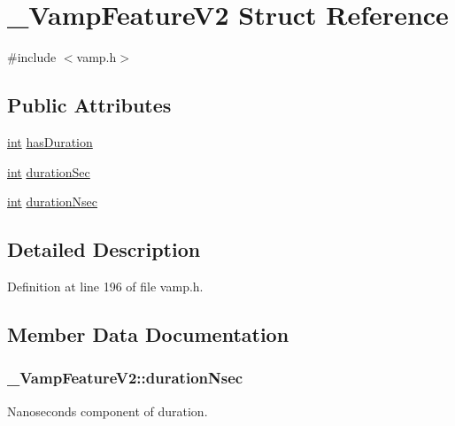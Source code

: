 \hypertarget{struct___vamp_feature_v2}{}\section{\+\_\+\+Vamp\+Feature\+V2 Struct Reference}
\label{struct___vamp_feature_v2}


{\ttfamily \#include $<$vamp.\+h$>$}

\subsection*{Public Attributes}
\begin{DoxyCompactItemize}
\item 
\hyperlink{xmltok_8h_a5a0d4a5641ce434f1d23533f2b2e6653}{int} \hyperlink{struct___vamp_feature_v2_a44d9c57f1ae197d3fec1a48c650cce81}{has\+Duration}
\item 
\hyperlink{xmltok_8h_a5a0d4a5641ce434f1d23533f2b2e6653}{int} \hyperlink{struct___vamp_feature_v2_abc95aac3a2efdef6ef0b17e7b6bd3daf}{duration\+Sec}
\item 
\hyperlink{xmltok_8h_a5a0d4a5641ce434f1d23533f2b2e6653}{int} \hyperlink{struct___vamp_feature_v2_af71693d907f69048d602d28edbce679e}{duration\+Nsec}
\end{DoxyCompactItemize}


\subsection{Detailed Description}


Definition at line 196 of file vamp.\+h.



\subsection{Member Data Documentation}
\subsubsection[{\texorpdfstring{duration\+Nsec}{durationNsec}}]{ \+\_\+\+Vamp\+Feature\+V2\+::duration\+Nsec}\hypertarget{struct___vamp_feature_v2_af71693d907f69048d602d28edbce679e}{}\label{struct___vamp_feature_v2_af71693d907f69048d602d28edbce679e}
Nanoseconds component of duration. 

